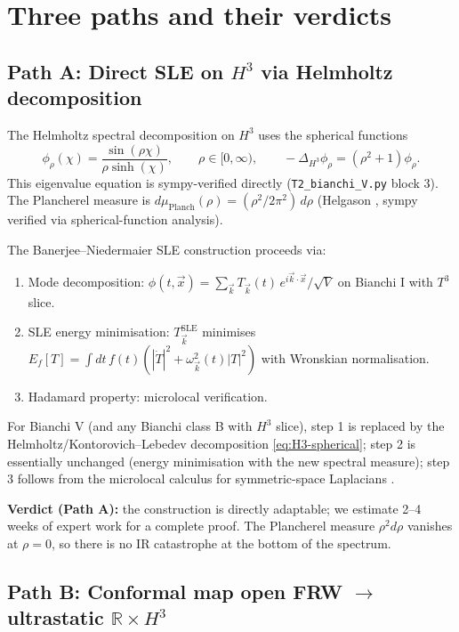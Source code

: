 \documentclass[11pt,a4paper]{article}
\theoremstyle{definition}
\newcommand{\R}{\mathbb{R}}
\begin{document}
\section{Three paths and their verdicts}

\subsection*{Path A: Direct SLE on $H^3$ via Helmholtz decomposition}

The Helmholtz spectral decomposition on $H^3$ uses the spherical functions
\begin{equation}\label{eq:H3-spherical}
  \phi_\rho(\chi) = \frac{\sin(\rho\chi)}{\rho\sinh(\chi)},\qquad
  \rho\in[0,\infty),\qquad
  -\Delta_{H^3}\phi_\rho = (\rho^2+1)\phi_\rho.
\end{equation}
This eigenvalue equation is sympy-verified directly
(\texttt{T2\_bianchi\_V.py} block 3). The Plancherel measure is
$d\mu_{\text{Planch}}(\rho)=(\rho^2/2\pi^2)\,d\rho$
(Helgason \cite{Helgason1981}, sympy verified via spherical-function
analysis).

The Banerjee--Niedermaier SLE construction \cite{BanerjeeNiedermaier2023}
proceeds via:
\begin{enumerate}
  \item Mode decomposition: $\phi(t,\vec x)=\sum_{\vec k} T_{\vec k}(t)\,
  e^{i\vec k\cdot\vec x}/\sqrt{V}$ on Bianchi I with $T^3$ slice.
  \item SLE energy minimisation: $T_{\vec k}^{\text{SLE}}$ minimises
  $E_f[T]=\int dt\,f(t)(|\dot T|^2+\omega_{\vec k}^2(t)|T|^2)$ with
  Wronskian normalisation.
  \item Hadamard property: microlocal verification.
\end{enumerate}

For Bianchi V (and any Bianchi class B with $H^3$ slice), step 1 is
replaced by the Helmholtz/Kontorovich--Lebedev decomposition
\eqref{eq:H3-spherical}; step 2 is essentially unchanged (energy
minimisation with the new spectral measure); step 3 follows from the
microlocal calculus for symmetric-space Laplacians \cite{Strohmaier2018}.

\textbf{Verdict (Path A):} the construction is directly adaptable; we
estimate 2--4 weeks of expert work for a complete proof. The Plancherel
measure $\rho^2 d\rho$ vanishes at $\rho=0$, so there is no IR
catastrophe at the bottom of the spectrum.

\subsection*{Path B: Conformal map open FRW $\to$ ultrastatic $\R\times H^3$}
\end{document}
